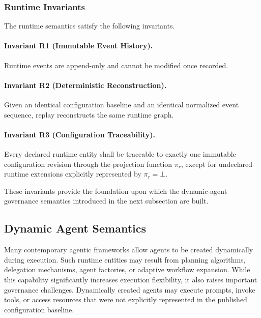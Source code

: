 \documentclass[10pt]{article}
\begin{document}
\subsubsection{Runtime Invariants}

The runtime semantics satisfy the following invariants.

\paragraph{Invariant R1 (Immutable Event History).}

Runtime events are append-only and cannot be modified once recorded.

\paragraph{Invariant R2 (Deterministic Reconstruction).}

Given an identical configuration baseline and an identical normalized event
sequence, replay reconstructs the same runtime graph.

\paragraph{Invariant R3 (Configuration Traceability).}

Every declared runtime entity shall be traceable to exactly one immutable
configuration revision through the projection function $\pi_r$, except for
undeclared runtime extensions explicitly represented by $\pi_r=\bot$.

These invariants provide the foundation upon which the dynamic-agent
governance semantics introduced in the next subsection are built.

\subsection{Dynamic Agent Semantics}
\label{subsec:dynamic_agents}

Many contemporary agentic frameworks allow agents to be created dynamically
during execution. Such runtime entities may result from planning algorithms,
delegation mechanisms, agent factories, or adaptive workflow expansion. While
this capability significantly increases execution flexibility, it also raises
important governance challenges. Dynamically created agents may execute prompts,
invoke tools, or access resources that were not explicitly represented in the
published configuration baseline.
\end{document}
